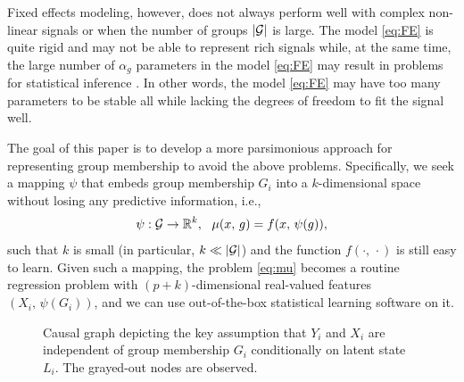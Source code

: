 \documentclass{article}
\theoremstyle{plain}
\theoremstyle{definition}
\theoremstyle{remark}
\begin{document}
Fixed effects modeling, however, does not always perform well with complex non-linear signals
or when the number of groups $\left\lvert\mathcal{G}\right\rvert$ is large. The model \eqref{eq:FE} is quite rigid
and may not be able to represent rich signals while, at the same time, the large number of $\alpha_g$
parameters in the model \eqref{eq:FE} may result in problems for statistical inference \citep{neyman1948consistent}.
In other words, the model \eqref{eq:FE} may have too many parameters to be stable all while lacking the
degrees of freedom to fit the signal well.

The goal of this paper is to develop a more parsimonious approach for representing group membership to
avoid the above problems. Specifically, we seek a mapping $\psi$ that embeds group membership $G_i$
into a $k$-dimensional space without losing any predictive information, i.e.,
\begin{equation}
\label{eq:repr}
\psi: \mathcal{G} \rightarrow \mathbb{R}^k, \ \ \mu(x, \, g) = f(x, \, \psi(g)),
\end{equation}
such that $k$ is small (in particular, $k \ll \left\lvert\mathcal{G}\right\rvert$) and the function $f(\cdot, \, \cdot)$ is still easy to learn.
Given such a mapping, the problem \eqref{eq:mu} becomes a routine regression problem with
$(p+k)$-dimensional real-valued features $(X_i, \, \psi(G_i))$, and we can use out-of-the-box statistical learning
software on it.

\begin{figure}[t]
\centering
{}
\caption{Causal graph depicting the key assumption that $Y_i$ and $X_i$ are independent of group
membership $G_i$ conditionally on latent state $L_i$. The grayed-out nodes are observed.}
\label{fig:graph_simple}
\end{figure}
\end{document}

